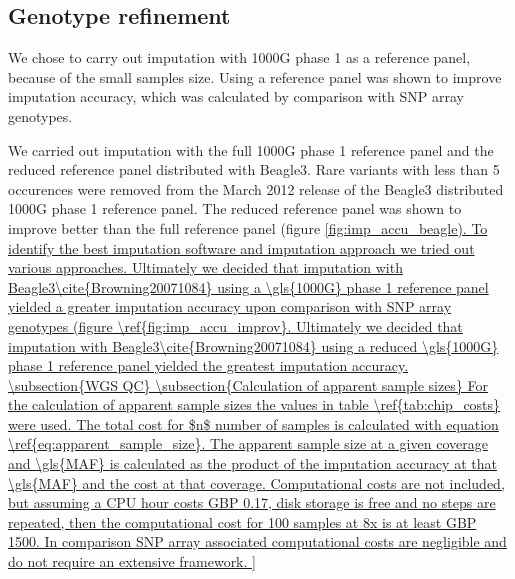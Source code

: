 \subsection{Genotype refinement}

We chose to carry out imputation with \gls{1000G} phase 1 as a reference panel, because of the small samples size. Using a reference panel was shown to improve imputation accuracy, which was calculated by comparison with SNP array genotypes.


We carried out imputation with the full 1000G phase 1 reference panel and the reduced reference panel distributed with Beagle3. Rare variants with less than 5 occurences were removed from the March 2012 release of the Beagle3 distributed 1000G phase 1 reference panel. The reduced reference panel was shown to improve better than the full reference panel (figure \ref{fig:imp_accu_beagle).

To identify the best imputation software and imputation approach we tried out various approaches. Ultimately we decided that imputation with Beagle3\cite{Browning20071084} using a \gls{1000G} phase 1 reference panel yielded a greater imputation accuracy upon comparison with SNP array genotypes (figure \ref{fig:imp_accu_improv}.


Ultimately we decided that imputation with Beagle3\cite{Browning20071084} using a reduced \gls{1000G} phase 1 reference panel yielded the greatest imputation accuracy.

\subsection{WGS QC}


\subsection{Calculation of apparent sample sizes}
For the calculation of apparent sample sizes the values in table \ref{tab:chip_costs} were used. The total cost  for $n$ number of samples is calculated with equation \ref{eq:apparent_sample_size}. The apparent sample size at a given coverage and \gls{MAF} is calculated as the product of the imputation accuracy at that \gls{MAF} and the cost at that coverage. Computational costs are not included, but assuming a CPU hour costs GBP 0.17, disk storage is free and no steps are repeated, then the computational cost for 100 samples at 8x is at least GBP 1500. In comparison SNP array associated computational costs are negligible and do not require an extensive framework.

}
